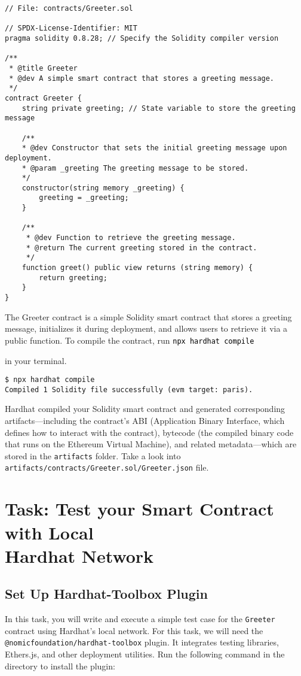 \documentclass[12pt]{article}
\newcommand{\codegrey}[1]{%
  \texttt{\colorbox{black!4}{\textcolor{black}{#1}}}%
}
\begin{document}
\noindent
\begin{minipage}[c]{\textwidth}
    \begin{lstlisting}[language=Solidity]
// File: contracts/Greeter.sol

// SPDX-License-Identifier: MIT
pragma solidity 0.8.28; // Specify the Solidity compiler version

/**
 * @title Greeter
 * @dev A simple smart contract that stores a greeting message.
 */
contract Greeter {
    string private greeting; // State variable to store the greeting message

    /**
    * @dev Constructor that sets the initial greeting message upon deployment.
    * @param _greeting The greeting message to be stored.
    */
    constructor(string memory _greeting) {
        greeting = _greeting;
    }

    /**
     * @dev Function to retrieve the greeting message.
     * @return The current greeting stored in the contract.
     */
    function greet() public view returns (string memory) {
        return greeting;
    }
}
\end{lstlisting}
\end{minipage}

The Greeter contract is a simple Solidity smart contract that stores a greeting
message, initializes it during deployment, and allows users to retrieve it via
a public function. To compile the contract, run \codegrey{npx hardhat compile}
in your terminal.

\begin{verbatim}
$ npx hardhat compile
Compiled 1 Solidity file successfully (evm target: paris).
\end{verbatim}

Hardhat compiled your Solidity smart contract and generated corresponding
artifacts—including the contract's ABI (Application Binary Interface, which
defines how to interact with the contract), bytecode (the compiled binary code
that runs on the Ethereum Virtual Machine), and related metadata—which are
stored in the \texttt{artifacts} folder. Take a look into
\texttt{artifacts/contracts/Greeter.sol/Greeter.json} file.

\section{Task: Test your Smart Contract with Local \\ Hardhat Network}

\subsection{Set Up Hardhat-Toolbox Plugin}
In this task, you will write and execute a simple test case for the
\texttt{Greeter} contract using Hardhat's local network. For this task, we will
need the \texttt{@nomicfoundation/hardhat-toolbox} plugin. It integrates
testing libraries, Ethers.js, and other deployment utilities. Run the following
command in the directory to install the plugin:
\end{document}
